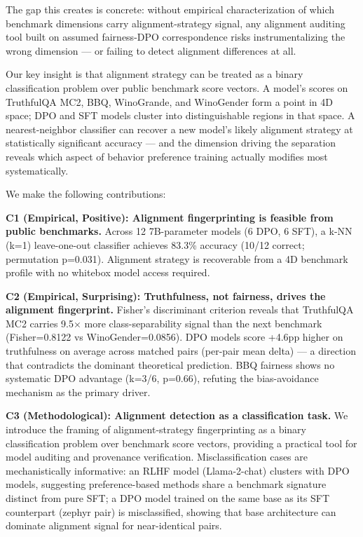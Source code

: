 The gap this creates is concrete: without empirical characterization of which benchmark
dimensions carry alignment-strategy signal, any alignment auditing tool built on assumed
fairness-DPO correspondence risks instrumentalizing the wrong dimension --- or failing
to detect alignment differences at all.

Our key insight is that alignment strategy can be treated as a binary classification
problem over public benchmark score vectors. A model's scores on TruthfulQA MC2, BBQ,
WinoGrande, and WinoGender form a point in 4D space; DPO and SFT models cluster into
distinguishable regions in that space. A nearest-neighbor classifier can recover a new
model's likely alignment strategy at statistically significant accuracy --- and the
dimension driving the separation reveals which aspect of behavior preference training
actually modifies most systematically.

We make the following contributions:

\textbf{C1 (Empirical, Positive): Alignment fingerprinting is feasible from public benchmarks.}
Across 12 7B-parameter models (6 DPO, 6 SFT), a k-NN (k=1) leave-one-out classifier
achieves 83.3\% accuracy (10/12 correct; permutation p=0.031). Alignment strategy is
recoverable from a 4D benchmark profile with no whitebox model access required.

\textbf{C2 (Empirical, Surprising): Truthfulness, not fairness, drives the alignment fingerprint.}
Fisher's discriminant criterion reveals that TruthfulQA MC2 carries 9.5$\times$ more class-separability
signal than the next benchmark (Fisher=0.8122 vs WinoGender=0.0856).
DPO models score +4.6pp higher on truthfulness on average across matched pairs
(per-pair mean delta) --- a direction that contradicts the dominant theoretical prediction. BBQ fairness shows no systematic DPO advantage
(k=3/6, p=0.66), refuting the bias-avoidance mechanism as the primary driver.

\textbf{C3 (Methodological): Alignment detection as a classification task.}
We introduce the framing of alignment-strategy fingerprinting as a binary classification
problem over benchmark score vectors, providing a practical tool for model auditing and
provenance verification. Misclassification cases are mechanistically informative: an
RLHF model (Llama-2-chat) clusters with DPO models, suggesting preference-based methods
share a benchmark signature distinct from pure SFT; a DPO model trained on the same
base as its SFT counterpart (zephyr pair) is misclassified, showing that base architecture
can dominate alignment signal for near-identical pairs.

